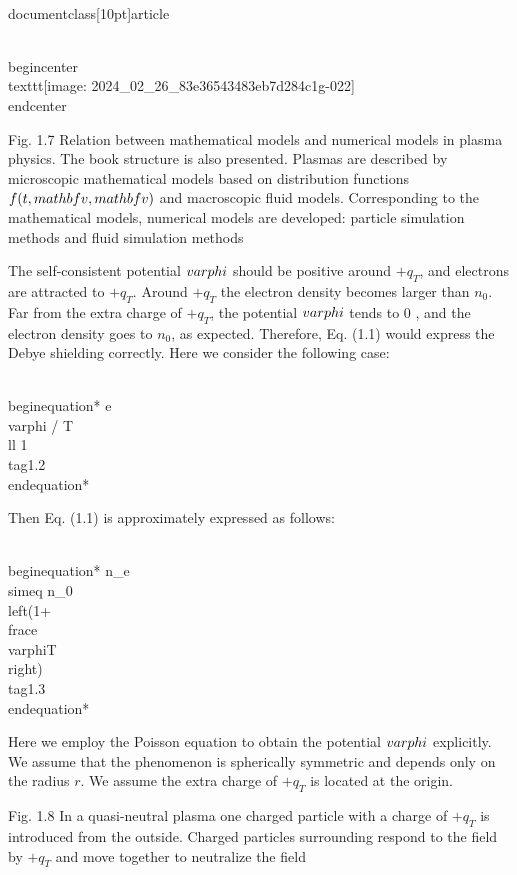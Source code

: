 \\documentclass[10pt]{article}
\begin{document}
\\begin{center}
\\texttt{[image: 2024\_02\_26\_83e36543483eb7d284c1g-022]}
\\end{center}

Fig. 1.7 Relation between mathematical models and numerical models in plasma physics. The book structure is also presented. Plasmas are described by microscopic mathematical models based on distribution functions $f(t, \\mathbf{v}, \\mathbf{v})$ and macroscopic fluid models. Corresponding to the mathematical models, numerical models are developed: particle simulation methods and fluid simulation methods

The self-consistent potential $\\varphi$ should be positive around $+q_{T}$, and electrons are attracted to $+q_{T}$. Around $+q_{T}$ the electron density becomes larger than $n_{0}$. Far from the extra charge of $+q_{T}$, the potential $\\varphi$ tends to 0 , and the electron density goes to $n_{0}$, as expected. Therefore, Eq. (1.1) would express the Debye shielding correctly. Here we consider the following case:


\\begin{equation*}
e \\varphi / T \\ll 1 \\tag{1.2}
\\end{equation*}


Then Eq. (1.1) is approximately expressed as follows:


\\begin{equation*}
n_{e} \\simeq n_{0}\\left(1+\\frac{e \\varphi}{T}\\right) \\tag{1.3}
\\end{equation*}


Here we employ the Poisson equation to obtain the potential $\\varphi$ explicitly. We assume that the phenomenon is spherically symmetric and depends only on the radius $r$. We assume the extra charge of $+q_{T}$ is located at the origin.

Fig. 1.8 In a quasi-neutral plasma one charged particle with a charge of $+q_{T}$ is introduced from the outside. Charged particles surrounding respond to the field by $+q_{T}$ and move together to neutralize the field
\end{document}
